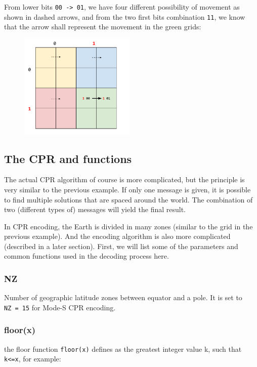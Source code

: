 From lower bits \texttt{00\ -\textgreater{}\ 01}, we have four different possibility of movement as shown in dashed arrows, and from the two first bits combination \texttt{11}, we know that the arrow shall represent the movement in the green grids:

\begin{figure}
  \center
  \includegraphics[width=5.5cm]{images/illustration-cpr-2.pdf}
\end{figure}

\subsection{The CPR and functions}\label{the-cpr-and-functions}

The actual CPR algorithm of course is more complicated, but the principle is very similar to the previous example. If only one message is given, it is possible to find multiple solutions that are spaced around the world. The combination of two (different types of) messages will yield the final result.

In CPR encoding, the Earth is divided in many zones (similar to the grid in the previous example). And the encoding algorithm is also more complicated (described in a later section). First, we will list some of the parameters and common functions used in the decoding process here.

\subsubsection{NZ}\label{nz}

Number of geographic latitude zones between equator and a pole. It is set to \texttt{NZ\ =\ 15} for Mode-S CPR encoding.

\subsubsection{floor(x)}\label{floorx}

the floor function \texttt{floor(x)} defines as the greatest integer value k, such that \texttt{k\textless{}=x}, for example:

